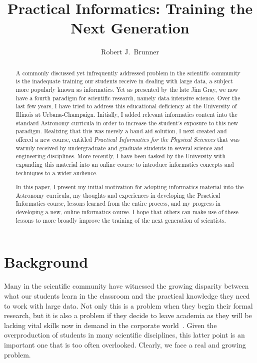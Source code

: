 
\resetcounters




\title{Practical Informatics: Training the Next Generation}
\author{Robert J.~Brunner}


\begin{abstract}
A commonly discussed yet infrequently addressed problem in the scientific community is the inadequate training our students receive in dealing with large data, a subject more popularly known as informatics. Yet as presented by the late Jim Gray, we now have a fourth paradigm for scientific research, namely data intensive science. Over the last few years, I have tried to address this educational deficiency at the University of Illinois at Urbana-Champaign. Initially, I added relevant informatics content into the standard Astronomy curricula in order to increase the student's exposure to this new paradigm. Realizing that this was merely a band-aid solution, I next created and offered a new course, entitled \textit{Practical Informatics for the Physical Sciences} that was warmly received by undergraduate and graduate students in several science and engineering disciplines. More recently, I have been tasked by the University with expanding this material into an online course to introduce informatics concepts and techniques to a wider audience.

In this paper, I present my initial motivation for adopting informatics material into the Astronomy curricula, my thoughts and experiences in developing the Practical Informatics course, lessons learned from the entire process, and my progress in developing a new, online informatics course. I hope that others can make use of these lessons to more broadly improve the training of the next generation of scientists.
\end{abstract}

\section{Background}
Many in the scientific community have witnessed the growing disparity between what our students learn in the classroom and the practical knowledge they need to work with large data. Not only this is a problem when they begin their formal research, but it is also a problem if they decide to leave academia as they will be lacking vital skills now in demand in the corporate world~\citep[see, \textit{e.g.},][]{loukides}. Given the overproduction of students in many scientific disciplines, this latter point is an important one that is too often overlooked. Clearly, we face a real and growing problem.

